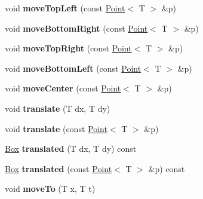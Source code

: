 \begin{DoxyCompactItemize}
\item 
\hypertarget{class_box_a25f13cb4c83114b15caa2d62675137bb}{
void {\bfseries moveTopLeft} (const \hyperlink{class_point}{Point}$<$ T $>$ \&p)}
\label{class_box_a25f13cb4c83114b15caa2d62675137bb}

\item 
\hypertarget{class_box_ae5103f2b496ac2f10105c41a336ec088}{
void {\bfseries moveBottomRight} (const \hyperlink{class_point}{Point}$<$ T $>$ \&p)}
\label{class_box_ae5103f2b496ac2f10105c41a336ec088}

\item 
\hypertarget{class_box_a13e447ff3e86e55f6cd66cd74a0d0c7a}{
void {\bfseries moveTopRight} (const \hyperlink{class_point}{Point}$<$ T $>$ \&p)}
\label{class_box_a13e447ff3e86e55f6cd66cd74a0d0c7a}

\item 
\hypertarget{class_box_a365ae8132302f9675d7d962fb7a8faec}{
void {\bfseries moveBottomLeft} (const \hyperlink{class_point}{Point}$<$ T $>$ \&p)}
\label{class_box_a365ae8132302f9675d7d962fb7a8faec}

\item 
\hypertarget{class_box_a62d7d531ad38076276749bcfc20285d2}{
void {\bfseries moveCenter} (const \hyperlink{class_point}{Point}$<$ T $>$ \&p)}
\label{class_box_a62d7d531ad38076276749bcfc20285d2}

\item 
\hypertarget{class_box_a2c3adee7df1462f3bfa5ae4870148505}{
void {\bfseries translate} (T dx, T dy)}
\label{class_box_a2c3adee7df1462f3bfa5ae4870148505}

\item 
\hypertarget{class_box_a077d6debae34fe86b701d7b2f8898c80}{
void {\bfseries translate} (const \hyperlink{class_point}{Point}$<$ T $>$ \&p)}
\label{class_box_a077d6debae34fe86b701d7b2f8898c80}

\item 
\hypertarget{class_box_a2ef351810ddbf2a2e39da170054ead61}{
\hyperlink{class_box}{Box} {\bfseries translated} (T dx, T dy) const }
\label{class_box_a2ef351810ddbf2a2e39da170054ead61}

\item 
\hypertarget{class_box_a6119c3112179fc2aa3f1b0e83cfec9a0}{
\hyperlink{class_box}{Box} {\bfseries translated} (const \hyperlink{class_point}{Point}$<$ T $>$ \&p) const }
\label{class_box_a6119c3112179fc2aa3f1b0e83cfec9a0}

\item 
\hypertarget{class_box_a484604d7fec04732de90ea55da3b7b6a}{
void {\bfseries moveTo} (T x, T t)}
\label{class_box_a484604d7fec04732de90ea55da3b7b6a}


\end{DoxyCompactItemize}
